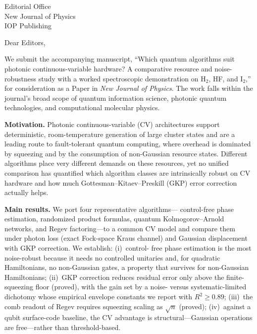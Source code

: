 \documentclass[11pt]{letter}
\begin{document}
\begin{letter}{Editorial Office \\ New Journal of Physics \\ IOP
Publishing}

\opening{Dear Editors,}

We submit the accompanying manuscript, ``Which quantum algorithms suit
photonic continuous-variable hardware? A comparative resource and
noise-robustness study with a worked spectroscopic demonstration on
H$_2$, HF, and I$_2$,'' for consideration as a Paper in \emph{New
Journal of Physics}. The work falls within the journal's broad scope of
quantum information science, photonic quantum technologies, and
computational molecular physics.

\textbf{Motivation.} Photonic continuous-variable (CV) architectures
support deterministic, room-temperature generation of large cluster
states and are a leading route to fault-tolerant quantum computing,
where overhead is dominated by squeezing and by the consumption of
non-Gaussian resource states. Different algorithms place very different
demands on these resources, yet no unified comparison has quantified
which algorithm classes are intrinsically robust on CV hardware and how
much Gottesman--Kitaev--Preskill (GKP) error correction actually helps.

\textbf{Main results.} We port four representative algorithms---%
control-free phase estimation, randomized product formulas, quantum
Kolmogorov--Arnold networks, and Regev factoring---to a common CV model
and compare them under photon loss (exact Fock-space Kraus channel) and
Gaussian displacement with GKP correction. We establish: (i)~control-%
free phase estimation is the most noise-robust because it needs no
controlled unitaries and, for quadratic Hamiltonians, no non-Gaussian
gates, a property that survives for non-Gaussian Hamiltonians;
(ii)~GKP correction reduces residual error only above the finite-%
squeezing floor (proved), with the gain set by a noise- versus
systematic-limited dichotomy whose empirical envelope constants we
report with $R^{2}\!\ge\!0.89$; (iii)~the comb readout of Regev requires
squeezing scaling as $\sqrt{n}$ (proved); (iv)~against a qubit
surface-code baseline, the CV advantage is structural---Gaussian
operations are free---rather than threshold-based.


\end{letter}
\end{document}
